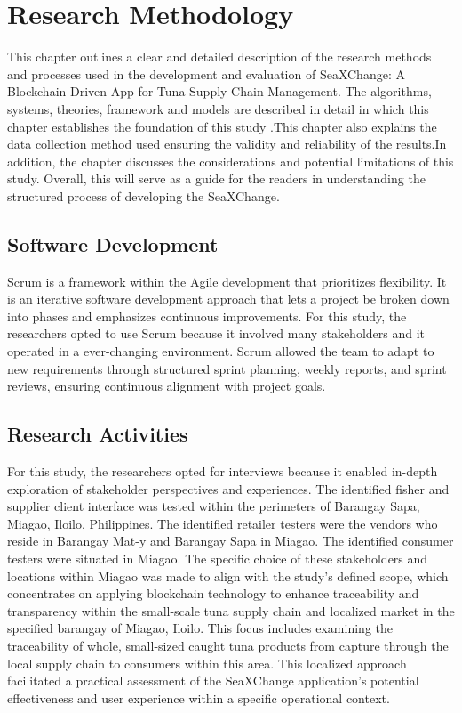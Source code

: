 \chapter{Research Methodology}
This chapter outlines a clear and detailed description of the research methods and processes used in the development and evaluation of SeaXChange: A Blockchain Driven App for Tuna Supply Chain Management. The algorithms, systems, theories, framework and models are described in detail in which this chapter establishes the foundation of this study .This chapter also explains the data collection method used ensuring the validity and reliability of the results.In addition, the chapter discusses the considerations and potential limitations of this study. Overall, this will serve as a guide for the readers in understanding the structured process of developing the SeaXChange.

\section{Software Development}
Scrum is a framework within the Agile development that prioritizes flexibility. It is an iterative software development approach that lets a project be broken down into phases and emphasizes continuous improvements. For this study, the researchers opted to use Scrum  because it involved many stakeholders and it operated in a ever-changing environment. Scrum allowed the team to adapt to new requirements through structured sprint planning, weekly reports, and sprint reviews, ensuring continuous alignment with project goals.

\section{Research Activities}
For this study, the researchers opted for interviews because it enabled in-depth exploration of stakeholder perspectives and experiences. The identified fisher and supplier client interface was tested within the perimeters of Barangay Sapa, Miagao, Iloilo, Philippines. The identified retailer testers were the vendors who reside in Barangay Mat-y and Barangay Sapa in Miagao. The identified consumer testers were situated in Miagao. The specific choice of these stakeholders and locations within Miagao was made to align with the study's defined scope, which concentrates on applying blockchain technology to enhance traceability and transparency within the small-scale tuna supply chain and localized market in the specified barangay of Miagao, Iloilo. This focus includes examining the traceability of whole, small-sized caught tuna products from capture through the local supply chain to consumers within this area. This localized approach facilitated a practical assessment of the SeaXChange application's potential effectiveness and user experience within a specific operational context.

